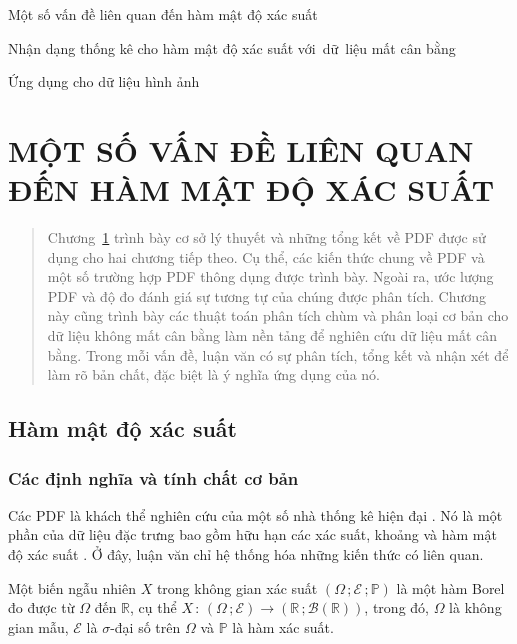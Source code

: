\documentclass[a4paper,oneside]{book} %
\theoremstyle{plain}
\theoremstyle{plain}
\newcommand{\dng}[1]{\begin{definition}#1\end{definition}}
\theoremstyle{nonumberplain}
\begin{document}
\begin{description}\it
	\item[Chương~\ref{chapter_1}.] Một số vấn đề liên quan đến hàm mật độ xác suất
	\item[Chương~\ref{chapter_2}.] Nhận dạng thống kê cho hàm mật độ xác suất với~dữ~liệu mất cân bằng
	\item[Chương~\ref{chapter_3}.] Ứng dụng cho dữ liệu hình ảnh
\end{description}


		\chapter{MỘT SỐ VẤN ĐỀ LIÊN QUAN ĐẾN HÀM MẬT ĐỘ XÁC SUẤT}\label{chapter_1}
	
	\begin{quotation}\fontsize{12pt}{14pt}\selectfont
		Chương~\ref{chapter_1} trình bày cơ sở lý thuyết và những tổng kết về PDF được sử dụng cho hai chương tiếp theo. Cụ thể, các kiến thức chung về PDF và một số trường hợp PDF thông dụng được trình bày. Ngoài ra, ước lượng PDF và độ đo đánh giá sự tương tự của chúng	được phân tích. Chương này cũng trình bày các thuật toán phân tích chùm và phân loại cơ bản cho dữ liệu không mất cân bằng làm nền tảng để nghiên cứu dữ liệu mất cân bằng. Trong mỗi vấn đề, luận văn có sự phân tích, tổng kết và nhận xét để làm rõ bản chất, đặc biệt là ý nghĩa ứng dụng của nó.
	\end{quotation}
	
\section{Hàm mật độ xác suất}


\subsection{Các định nghĩa và tính chất cơ bản}
Các PDF là khách thể nghiên cứu của một số nhà thống kê hiện đại \cite{Tai2010,billard2012symbolic,irpino2015basic}. Nó là một phần của dữ liệu đặc trưng bao gồm hữu hạn các xác suất, khoảng và hàm mật độ xác suất \cite{billard2012symbolic}. Ở đây, luận văn chỉ hệ thống hóa những kiến thức có liên quan.

\dng{[Biến ngẫu nhiên] Một biến ngẫu nhiên $X$ trong không gian xác suất $(\Omega\,;\mathcal{E}\,;\mathbb{P})$ là một hàm Borel đo được từ $\Omega$ đến $\mathbb{R}$, cụ thể $X\,:\,(\Omega\,;\mathcal{E})\to(\mathbb{R}\,;\mathcal{B}(\mathbb{R}))$,
	trong đó, $\Omega$ là không gian mẫu, $\mathcal{E}$ là $\sigma$-đại số trên $\Omega$ và $\mathbb{P}$ là hàm xác suất.
}
\end{document}

